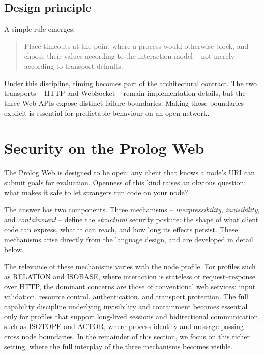 \subsection{Design principle}

A simple rule emerges:

\begin{quote}
Place timeouts at the point where a process would otherwise block,
and choose their values according to the interaction model -- not
merely according to transport defaults.
\end{quote}

\noindent Under this discipline, timing becomes part of the
architectural contract. The two transports -- HTTP and WebSocket --
remain implementation details, but the three Web APIs expose distinct
failure boundaries. Making those boundaries explicit is essential for
predictable behaviour on an open network.


\section{Security on the Prolog Web}\label{sec:security-prolog-web}

The Prolog Web is designed to be open: any client that knows a node's
URI can submit goals for evaluation. Openness of this kind raises an
obvious question: what makes it safe to let strangers run code on
your node?

The answer has two components. Three mechanisms --
\emph{inexpressibility}, \emph{invisibility}, and
\emph{containment} -- define the \emph{structural} security
posture: the shape of what client code can express, what it can
reach, and how long its effects persist. These mechanisms arise directly from the language design, and are developed in detail below. 

The relevance of these mechanisms varies with the node profile. For
profiles such as RELATION and ISOBASE, where interaction is
stateless or request--response over HTTP, the dominant concerns are
those of conventional web services: input validation,
resource control, authentication, and transport protection. The
full capability discipline underlying invisibility and containment
becomes essential only for profiles that support long-lived sessions
and bidirectional communication, such as ISOTOPE and ACTOR, where
process identity and message passing cross node boundaries. In the
remainder of this section, we focus on this richer setting, where
the full interplay of the three mechanisms becomes visible.

